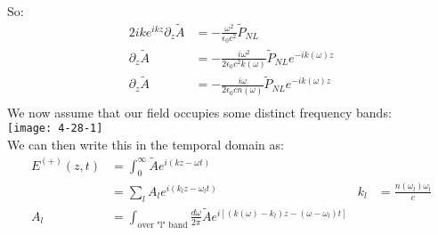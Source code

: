 So:
\begin{align*}
	2ike^{ikz} \partial_z \tilde{A} &= -\frac{\omega^2}{\epsilon_0 c^2}\tilde{P}_{NL} \\
	\partial_z \tilde{A} &= -\frac{i\omega^2}{2\epsilon_0 c^2k(\omega)}\tilde{P}_{NL} e^{-ik(\omega)z} \\
	\partial_z \tilde{A} &= -\frac{i\omega}{2\epsilon_0 cn(\omega)}\tilde{P}_{NL} e^{-ik(\omega)z} \\
\end{align*}
We now assume that our field occupies some distinct frequency bands:\\
\texttt{[image: 4-28-1]}\\
We can then write this in the temporal domain as:
\begin{align*}
	E^{(+)}(z,t) &= \int_0^\infty \tilde{A} e^{i(kz-\omega t)} \\
	&= \sum_l A_l e^{i(k_l z - \omega_l t)} & k_l &= \frac{n(\omega_l)\omega_l}{c} \\
	A_l &= \int_{\text{over "l" band}} \frac{d\omega}{2\pi} \tilde{A} e^{i[(k(\omega)- k_l)z - (\omega-\omega_l)t]}
\end{align*}
